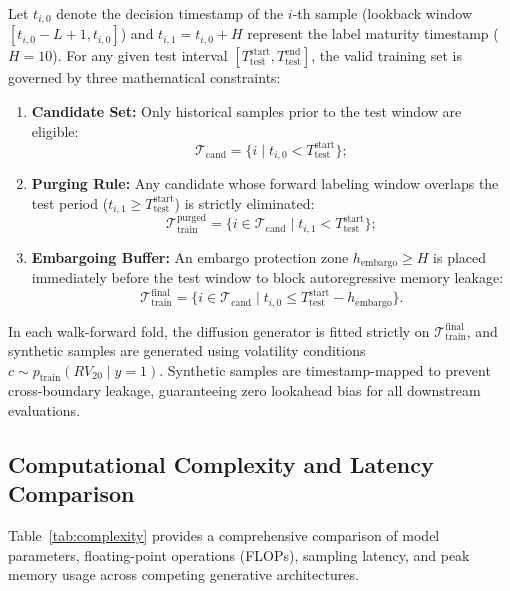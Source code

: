\documentclass[preprint,12pt,authoryear]{elsarticle}
\begin{document}
Let $t_{i,0}$ denote the decision timestamp of the $i$-th sample (lookback window $[t_{i,0}-L+1, t_{i,0}]$) and $t_{i,1} = t_{i,0} + H$ represent the label maturity timestamp ($H=10$). For any given test interval $[T_{\text{test}}^{\text{start}}, T_{\text{test}}^{\text{end}}]$, the valid training set is governed by three mathematical constraints:
\begin{enumerate}[label=(\arabic*),leftmargin=1.8em]
    \item \textbf{Candidate Set:} Only historical samples prior to the test window are eligible:
    \begin{equation}
        \mathcal{T}_{\text{cand}} = \{ i \mid t_{i,0} < T_{\text{test}}^{\text{start}} \};
    \end{equation}
    \item \textbf{Purging Rule:} Any candidate whose forward labeling window overlaps the test period ($t_{i,1} \ge T_{\text{test}}^{\text{start}}$) is strictly eliminated:
    \begin{equation}
        \mathcal{T}_{\text{train}}^{\text{purged}} = \{ i \in \mathcal{T}_{\text{cand}} \mid t_{i,1} < T_{\text{test}}^{\text{start}} \};
    \end{equation}
    \item \textbf{Embargoing Buffer:} An embargo protection zone $h_{\text{embargo}} \ge H$ is placed immediately before the test window to block autoregressive memory leakage:
    \begin{equation}
        \mathcal{T}_{\text{train}}^{\text{final}} = \{ i \in \mathcal{T}_{\text{cand}} \mid t_{i,0} \le T_{\text{test}}^{\text{start}} - h_{\text{embargo}} \}.
    \end{equation}
\end{enumerate}
In each walk-forward fold, the diffusion generator is fitted strictly on $\mathcal{T}_{\text{train}}^{\text{final}}$, and synthetic samples are generated using volatility conditions $c \sim p_{\text{train}}(RV_{20} \mid y=1)$. Synthetic samples are timestamp-mapped to prevent cross-boundary leakage, guaranteeing zero lookahead bias for all downstream evaluations.

\subsection{Computational Complexity and Latency Comparison}
Table~\ref{tab:complexity} provides a comprehensive comparison of model parameters, floating-point operations (FLOPs), sampling latency, and peak memory usage across competing generative architectures.
\end{document}
